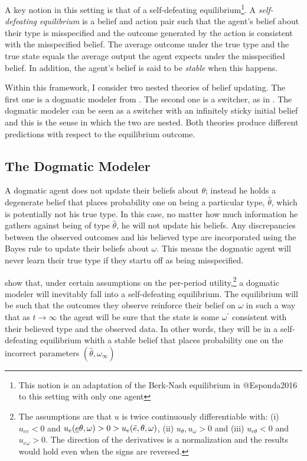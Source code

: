 \documentclass[
  12pt,
]{article}
\begin{document}
A key notion in this setting is that of a self-defeating
equilibrium\footnote{This notion is an adaptation of the Berk-Nash equilibrium in 
@Esponda2016 to this setting with only one agent}. A
\emph{self-defeating equilibrium} is a belief and action pair such that
the agent's belief about their type is misspecified and the outcome
generated by the action is consistent with the misspecified belief. The
average outcome under the true type and the true state equals the
average output the agent expects under the misspecified belief. In
addition, the agent's belief is said to be \emph{stable} when this
happens.

Within this framework, I consider two nested theories of belief
updating. The first one is a dogmatic modeler from \citet{Heidhues2018}.
The second one is a switcher, as in \citet{Ba2023}. The dogmatic modeler
can be seen as a switcher with an infinitely sticky initial belief and
this is the sense in which the two are nested. Both theories produce
different predictions with respect to the equilibrium outcome.

\hypertarget{the-dogmatic-modeler}{%
\subsection{The Dogmatic Modeler}\label{the-dogmatic-modeler}}

A dogmatic agent does not update their beliefs about \(\theta\); instead
he holds a degenerate belief that places probability one on being a
particular type, \(\hat{\theta}\), which is potentially not his true
type. In this case, no matter how much information he gathers against
being of type \(\hat{\theta}\), he will not update his beliefs. Any
discrepancies between the observed outcomes and his believed type are
incorporated using the Bayes rule to update their beliefs about
\(\omega\). This means the dogmatic agent will never learn their true
type if they startu off as being misspecified.

\citet{Heidhues2018} show that, under certain assumptions on the
per-period utility,\footnote{The assumptions are that 
$u$ is twice continuously differentiable with: (i)$u_{ee}<0$ and $u_e(\underline{e} \theta, \omega)>0>u_e(\Bar{e}, \theta, \omega)$, 
(ii) $u_{\theta}, u_{\omega}>0$ and (iii) $u_{e\theta}<0$ and $u_{e\omega}>0$. The direction of the derivatives is a normalization
and the results would hold even when the signs are reversed.} a dogmatic
modeler will inevitably fall into a self-defeating equilibrium. The
equilibrium will be such that the outcomes they observe reinforce their
belief on \(\omega\) in such a way that as \(t\to\infty\) the agent will
be sure that the state is some \(\omega^{'}\) consistent with their
believed type and the observed data. In other words, they will be in a
self-defeating equilibrium whith a stable belief that places probability
one on the incorrect parameters \((\hat{\theta}, \omega_{\infty})\)
\end{document}
